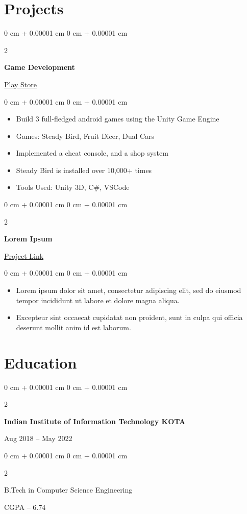 \documentclass[11pt, a4paper]{article}
\newenvironment{highlights}{
    \begin{itemize}[
        topsep=0.10 cm,
        parsep=0.10 cm,
        partopsep=0pt,
        itemsep=0pt,
        leftmargin=0 cm + 10pt
    ]
}{
    \end{itemize}
} %
\newenvironment{onecolentry}{
    \begin{adjustwidth}{
        0 cm + 0.00001 cm
    }{
        0 cm + 0.00001 cm
    }
}{
    \end{adjustwidth}
} %
\newenvironment{twocolentry}[2][]{
    \onecolentry
    \def\secondColumn{#2}
    \setcolumnwidth{\fill, 4.5 cm}
    \begin{paracol}{2}
}{
    \switchcolumn \raggedleft \secondColumn
    \end{paracol}
    \endonecolentry
} %
\begin{document}
    \section{Projects}
        \begin{twocolentry}{\href{https://play.google.com/store/apps/dev?id=5970738356311592163}{Play Store\hspace{0.15 cm}\faLink}}
            \textbf{Game Development}
        \end{twocolentry}
        \vspace{0.1 cm}
        \begin{onecolentry}
            \begin{highlights}
                \item Build 3 full-fledged android games using the Unity Game Engine
                \item Games: Steady Bird, Fruit Dicer, Dual Cars
                \item Implemented a cheat console, and a shop system
                \item Steady Bird is installed over 10,000+ times
                \item Tools Used: Unity 3D, C\#, VSCode
            \end{highlights}
        \end{onecolentry}
        \vspace{0.2 cm}
        \begin{twocolentry}{\href{https://www.google.com}{Project Link\hspace{0.15 cm}\faLink}}
            \textbf{Lorem Ipsum}
        \end{twocolentry}
        \vspace{0.1 cm}
        \begin{onecolentry}
            \begin{highlights}
                \item Lorem ipsum dolor sit amet, consectetur adipiscing elit, sed do eiusmod tempor incididunt ut labore et dolore magna aliqua.
                \item Excepteur sint occaecat cupidatat non proident, sunt in culpa qui officia deserunt mollit anim id est laborum.
            \end{highlights}
        \end{onecolentry}
    \section{Education}
        \begin{twocolentry}{Aug 2018 – May 2022}
            \textbf{Indian Institute of Information Technology KOTA}
        \end{twocolentry}
        \vspace{0.1 cm}
        \begin{twocolentry}{CGPA – 6.74}
            B.Tech in Computer Science Engineering
        \end{twocolentry}
\end{document}
